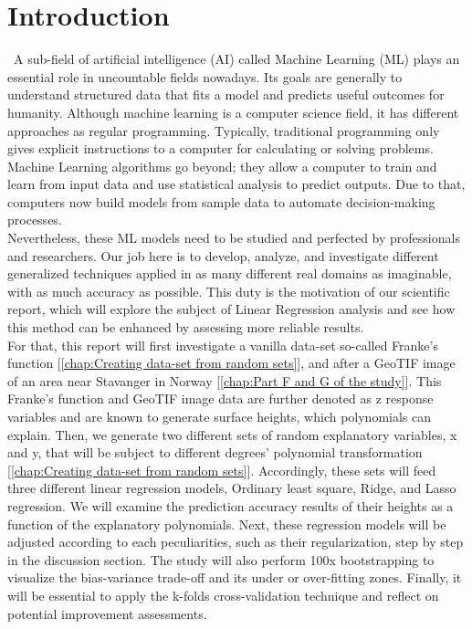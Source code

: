 \section{Introduction}
\label{chap:Introduction}

\quad \, A sub-field of artificial intelligence (AI) called Machine Learning (ML) plays an essential role in uncountable fields nowadays. Its goals are generally to understand structured data that fits a model and predicts useful outcomes for humanity. Although machine learning is a computer science field, it has different approaches as regular programming. Typically, traditional programming only gives explicit instructions to a computer for calculating or solving problems. Machine Learning algorithms go beyond; they allow a computer to train and learn from input data and use statistical analysis to predict outputs. Due to that, computers now build models from sample data to automate decision-making processes.\\

Nevertheless, these ML models need to be studied and perfected by professionals and researchers. Our job here is to develop, analyze, and investigate different generalized techniques applied in as many different real domains as imaginable, with as much accuracy as possible. This duty is the motivation of our scientific report, which will explore the subject of Linear Regression analysis and see how this method can be enhanced by assessing more reliable results.\\

For that, this report will first investigate a vanilla data-set so-called Franke's function [\ref{chap:Creating data-set from random sets}], and after a GeoTIF image of an area near Stavanger in Norway [\ref{chap:Part F and G of the study}]. This Franke's function and GeoTIF image data are further denoted as z response variables and are known to generate surface heights, which polynomials can explain. Then, we generate two different sets of random explanatory variables, x and y, that will be subject to different degrees' polynomial transformation [\ref{chap:Creating data-set from random sets}]. Accordingly, these sets will feed three different linear regression models, Ordinary least square, Ridge, and Lasso regression. We will examine the prediction accuracy results of their heights as a function of the explanatory polynomials. Next, these regression models will be adjusted according to each peculiarities, such as their regularization, step by step in the discussion section. The study will also perform 100x bootstrapping to visualize the bias-variance trade-off and its under or over-fitting zones. Finally, it will be essential to apply the k-folds cross-validation technique and reflect on potential improvement assessments.\\

